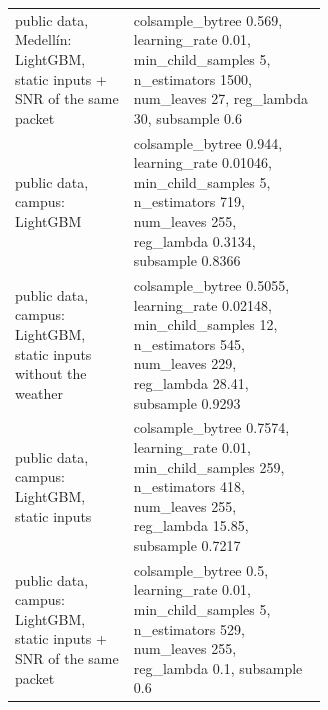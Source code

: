 \begin{table}[t]
\begin{tabular}{lp{0.62\linewidth}}
public data, Medellín: LightGBM, static inputs + SNR of the same packet & colsample\_bytree 0.569, learning\_rate 0.01, min\_child\_samples 5, n\_estimators 1500, num\_leaves 27, reg\_lambda 30, subsample 0.6 \\
public data, campus: LightGBM & colsample\_bytree 0.944, learning\_rate 0.01046, min\_child\_samples 5, n\_estimators 719, num\_leaves 255, reg\_lambda 0.3134, subsample 0.8366 \\
public data, campus: LightGBM, static inputs without the weather & colsample\_bytree 0.5055, learning\_rate 0.02148, min\_child\_samples 12, n\_estimators 545, num\_leaves 229, reg\_lambda 28.41, subsample 0.9293 \\
public data, campus: LightGBM, static inputs & colsample\_bytree 0.7574, learning\_rate 0.01, min\_child\_samples 259, n\_estimators 418, num\_leaves 255, reg\_lambda 15.85, subsample 0.7217 \\
public data, campus: LightGBM, static inputs + SNR of the same packet & colsample\_bytree 0.5, learning\_rate 0.01, min\_child\_samples 5, n\_estimators 529, num\_leaves 255, reg\_lambda 0.1, subsample 0.6 \\
\bottomrule
\end{tabular}
\end{table}
